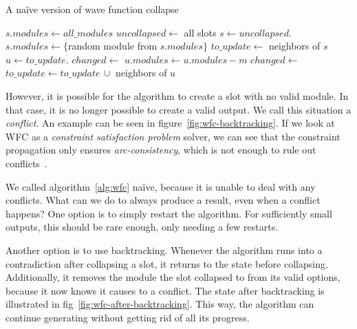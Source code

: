 \begin{algorithm}[H]
    \caption{A na\"{i}ve version of wave function collapse}
    \label{alg:wfc}
    \begin{algorithmic}[1]
         
        \State $s.modules \gets all\_modules$
        \EndFor
        \Statex
        \State $uncollapsed \gets$ all slots
        \State $s \gets uncollapsed$. 
        \State $s.modules \gets \{$random module from $s.modules\}$
        \Statex
        \State $to\_update \gets$ neighbors of $s$ 
        \State $u \gets to\_update$.
        \Statex
        \State $changed \gets$ 
         
        \State $u.modules \gets u.modules - m$
        \State $changed \gets$ 
        \EndIf
        \EndFor
        \Statex
         
        \State $to\_update \gets to\_update\,\cup$ neighbors of $u$
        \EndIf
        \Statex
        \EndWhile
        \EndWhile
        \Statex
    \end{algorithmic}
\end{algorithm}

However, it is possible for the algorithm to create a slot with no valid module.
In that case, it is no longer possible to create a valid output.
We call this situation a \emph{conflict}.
An example can be seen in figure~\ref{fig:wfc-backtracking}.
If we look at WFC as a \emph{constraint satisfaction problem} solver, we can see that the constraint propagation only ensures \emph{arc-consistency}, which is not enough to rule out conflicts~\cite{LocalConsistencyWiki}.

We called algorithm~\ref{alg:wfc} na\"{i}ve, because it is unable to deal with any conflicts.
What can we do to always produce a result, even when a conflict happens?
One option is to simply restart the algorithm.
For sufficiently small outputs, this should be rare enough, only needing a few restarts.

Another option is to use backtracking.
Whenever the algorithm runs into a contradiction after collapsing a slot, it returns to the state before collapsing.
Additionally, it removes the module the slot collapsed to from its valid options, because it now knows it causes to a conflict.
The state after backtracking is illustrated in fig~\ref{fig:wfc-after-backtracking}.
This way, the algorithm can continue generating without getting rid of all its progress.

